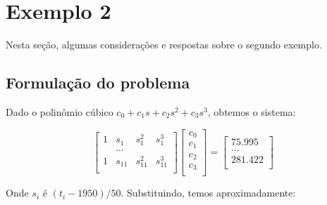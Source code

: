 \documentclass[12pt,a4paper]{article}
\begin{document}
\pagebreak
\section{Exemplo 2}
Nesta seção, algumas considerações e respostas sobre o segundo exemplo.
\subsection{Formulação do problema}
Dado o polinômio cúbico $c_0 + c_1s + c_2s^2 + c_3s^3$, obtemos o sistema:

\[
\left[
\begin{array}{cccc}
    1 & s_1 & s_{1}^{2} & s_{1}^{3} \\
      & ... \\
    1 & s_{11} & s_{11}^{2} & s_{11}^{3} \\
\end{array}
\right]
\left[
\begin{array}{c}
    c_0 \\
    c_1 \\
    c_2 \\
    c_3 \\
\end{array}
\right]
=
\left[
\begin{array}{c}
    75.995 \\
    ... \\
    281.422 \\
\end{array}
\right]
\]

Onde $s_i$ é $(t_i-1950)/50$. Substituindo, temos aproximadamente:
\end{document}
